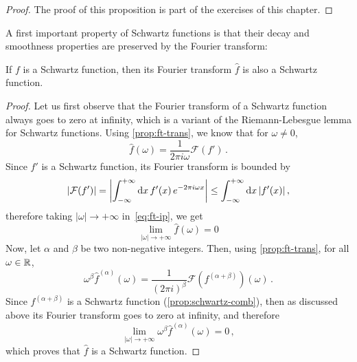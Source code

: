 \begin{proof}
  The proof of this proposition is part of the exercises of this chapter.
\end{proof}
A first important property of Schwartz functions is that their decay and smoothness
properties are preserved by the Fourier transform:
\begin{theorem}
  If $f$ is a Schwartz function, then its Fourier transform $\hat{f}$ is also a Schwartz
  function.
\end{theorem}
\begin{proof}
  Let us first observe that the Fourier transform of a Schwartz function always goes to
  zero at infinity, which is a variant of the Riemann-Lebesgue lemma for Schwartz
  functions. Using \cref{prop:ft-trans}, we know that for $\omega\neq 0$,
  \begin{equation}
    \hat{f}(\omega)=\frac{1}{2\pi i\omega}\mathcal{F}(f')\,.\label{eq:ft-ip}
  \end{equation}
  Since $f'$ is a Schwartz function, its Fourier transform is bounded by
  \begin{equation}
    |\mathcal{F}(f')|=\left|\int_{-\infty}^{+\infty}\mathrm{d}{x}\,f'(x)\,e^{-2\pi i \omega x}\right|\leq
    \int_{-\infty}^{+\infty}\mathrm{d}{x}\,|f'(x)|\,,
  \end{equation}
  therefore taking $|\omega|\to+\infty$ in~\cref{eq:ft-ip}, we get
  \begin{equation}
    \lim_{|\omega|\to+\infty}\hat{f}(\omega)=0
  \end{equation}
  Now, let $\alpha$ and $\beta$ be two non-negative integers. Then, using
  \cref{prop:ft-trans}, for all $\omega\in\mathbb{R}$,
  \begin{equation}
    \omega^\beta\hat{f}^{(\alpha)}(\omega)=\frac{1}{(2\pi i)^{\beta}}\mathcal{F}(f^{(\alpha+\beta)})(\omega)\,.
  \end{equation}
  Since $f^{(\alpha+\beta)}$ is a Schwartz function (\cref{prop:schwartz-comb}), then as
  discussed above its Fourier transform goes to zero at infinity, and therefore
  \begin{equation}
    \lim_{|\omega|\to+\infty}\omega^\beta\hat{f}^{(\alpha)}(\omega)=0\,,
  \end{equation}
  which proves that $\hat{f}$ is a Schwartz function.
\end{proof}
